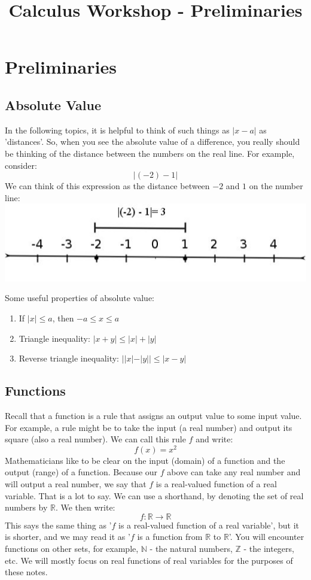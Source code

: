 \documentclass[12pt,a4paper]{article} %
\title{Calculus Workshop - Preliminaries}
\begin{document}
\maketitle
\section{Preliminaries}
\subsection{Absolute Value}
In the following topics, it is helpful to think of such things as $|x -a|$ as 'distances'.  So, when you see the absolute value of a difference, you really should be thinking of the distance between the numbers on the real line.  For example, consider:
$$|(-2) - 1|$$
We can think of this expression as the distance between $-2$ and $1$ on the number line:
\includegraphics[]{dist.jpg}

Some useful properties of absolute value:
\begin{enumerate}
\item If $|x|\leq a$, then $-a\leq x\leq a$
\item Triangle inequality:  $|x +y| \leq |x| +|y|$
\item Reverse triangle inequality: $||x|-|y|| \leq |x-y|$
\end{enumerate}

\subsection{Functions}
Recall that a function is a rule that assigns an output value to some input value.  For example, a rule might be to take the input (a real number) and output its square (also a real number).  We can call this rule $f$ and write:
\begin{equation*}
f(x) = x^2
\end{equation*}
Mathematicians like to be clear on the input (domain) of a function and the output (range) of a function.  Because our $f$ above can take any real number and will output a real number, we say that $f$ is a real-valued function of a real variable.  That is a lot to say.  We can use a shorthand, by denoting the set of real numbers by $\mathbb{R}$.  We then write:
\begin{equation}
f:\mathbb{R}\rightarrow \mathbb{R}
\end{equation}
This says the same thing as '$f$ is a real-valued function of a real variable', but it is shorter, and we may read it as '$f$ is a function from $\mathbb{R}$ to $\mathbb{R}$'.  You will encounter functions on other sets, for example, $\mathbb{N}$ - the natural numbers, $\mathbb{Z}$ - the integers, etc.  We will mostly focus on real functions of real variables for the purposes of these notes. 
\end{document}
